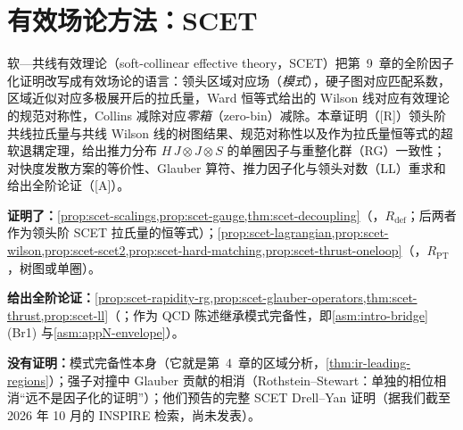 \chapter{有效场论方法：SCET}\label{ch:scet}

软—共线有效理论（soft-collinear effective theory，SCET）\cite{BauerFlemingLuke2000,BauerEtAl2001,BauerStewart2001,BauerPirjolStewart2002,BauerEtAl2002}把第~9~章的全阶因子化证明改写成有效场论的语言：领头区域对应场（\emph{模式}），硬子图对应匹配系数，区域近似对应多极展开后的拉氏量，Ward 恒等式给出的 Wilson 线对应有效理论的规范对称性，Collins 减除对应\emph{零箱}（zero-bin）减除。本章证明（[R]）领头阶共线拉氏量与共线 Wilson 线的树图结果、规范对称性以及作为拉氏量恒等式的超软退耦定理，给出推力分布 $H\,J\otimes J\otimes S$ 的单圈因子与重整化群（RG）一致性；对快度发散方案的等价性、Glauber 算符、推力因子化与领头对数（LL）重求和给出全阶论证（[A]）。

\begin{tcolorbox}[enhanced,breakable,title=本章证明了什么／没有证明什么,fonttitle=\bfseries,
  colback=gray!3!white,colframe=gray!55!black,boxrule=0.6pt,arc=2pt,
  left=5pt,right=5pt,top=3pt,bottom=3pt,before skip=6pt,after skip=6pt]
\textbf{证明了：}\cref{prop:scet-scalings,prop:scet-gauge,thm:scet-decoupling}（\tagR，$R_{\mathrm{def}}$；后两者作为领头阶 SCET 拉氏量的恒等式）；\cref{prop:scet-lagrangian,prop:scet-wilson,prop:scet-scet2,prop:scet-hard-matching,prop:scet-thrust-oneloop}（\tagR，$R_{\mathrm{PT}}$，树图或单圈）。\par
\textbf{给出全阶论证：}\cref{prop:scet-rapidity-rg,prop:scet-glauber-operators,thm:scet-thrust,prop:scet-ll}（\tagA；作为 QCD 陈述继承模式完备性，即\cref{asm:intro-bridge}(Br1) 与\cref{asm:appN-envelope}）。\par
\textbf{没有证明：}模式完备性本身（它就是第~4~章的区域分析，\cref{thm:ir-leading-regions}）；强子对撞中 Glauber 贡献的相消（Rothstein--Stewart：单独的相位相消“远不是因子化的证明”）；他们预告的完整 SCET Drell--Yan 证明（据我们截至 2026 年 10 月的 INSPIRE 检索，尚未发表）。
\end{tcolorbox}

